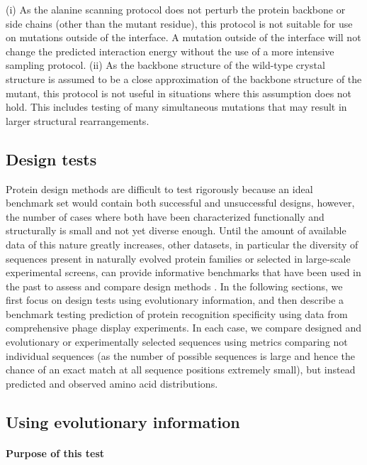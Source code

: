(i) As the alanine scanning protocol does not perturb the protein backbone or side chains (other than the mutant residue), this protocol is not suitable for use on mutations outside of the interface. A mutation outside of the interface will not change the predicted interaction energy without the use of a more intensive sampling protocol. (ii) As the backbone structure of the wild-type crystal structure is assumed to be a close approximation of the backbone structure of the mutant, this protocol is not useful in situations where this assumption does not hold. This includes testing of many simultaneous mutations that may result in larger structural rearrangements.

\subsection{Design tests}

Protein design methods are difficult to test rigorously because an ideal benchmark set would contain both successful and unsuccessful designs, however, the number of cases where both have been characterized functionally and structurally is small and not yet diverse enough. Until the amount of available data of this nature greatly increases, other datasets, in particular the diversity of sequences present in naturally evolved protein families or selected in large-scale experimental screens, can provide informative benchmarks that have been used in the past to assess and compare design methods
\cite{ollikainen_computational_2013,ollikainen_chapter_2013}. In the following sections, we first focus on design tests using evolutionary information, and then describe a benchmark testing prediction of protein recognition specificity using data from comprehensive phage display experiments. In each case, we compare designed and evolutionary or experimentally selected sequences using metrics comparing not individual sequences (as the number of possible sequences is large and hence the chance of an exact match at all sequence positions extremely small), but instead predicted and observed amino acid distributions.

\subsection{Using evolutionary information}

\paragraph{Purpose of this test}

